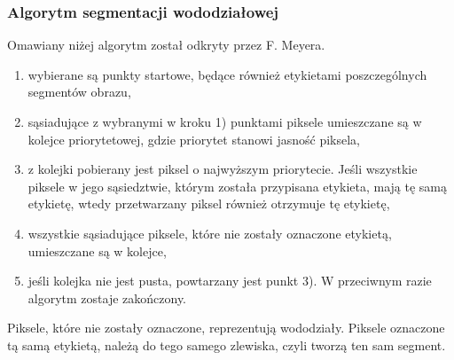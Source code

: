 \subsubsection{Algorytm segmentacji wododziałowej}
Omawiany niżej algorytm został odkryty przez F. Meyera.
\begin{enumerate}
  \item wybierane są punkty startowe, będące również etykietami poszczególnych segmentów obrazu,
  \item sąsiadujące z wybranymi w kroku 1) punktami piksele umieszczane są w kolejce priorytetowej, gdzie priorytet stanowi jasność piksela,
  \item z kolejki pobierany jest piksel o najwyższym priorytecie. Jeśli wszystkie piksele w jego sąsiedztwie, którym została przypisana etykieta, mają tę samą etykietę, wtedy przetwarzany piksel również otrzymuje tę etykietę,
  \item wszystkie sąsiadujące piksele, które nie zostały oznaczone etykietą, umieszczane są w kolejce,
  \item jeśli kolejka nie jest pusta, powtarzany jest punkt 3). W przeciwnym razie algorytm zostaje zakończony.
\end{enumerate}
Piksele, które nie zostały oznaczone, reprezentują wododziały. Piksele oznaczone tą samą etykietą, należą do tego samego zlewiska, czyli tworzą ten sam segment.
